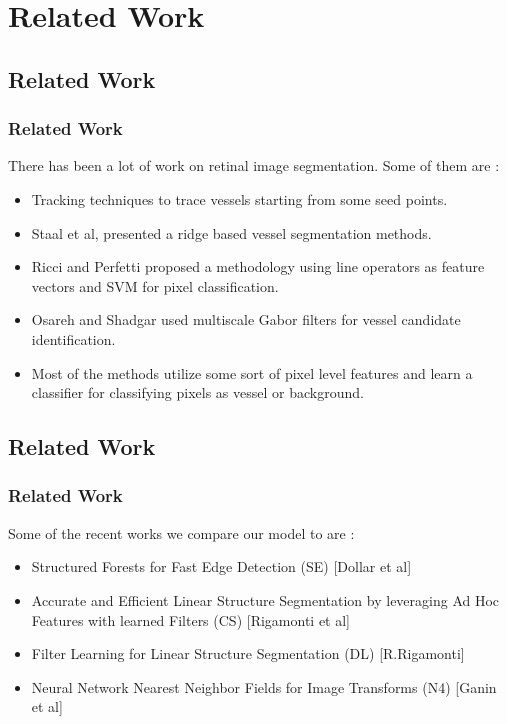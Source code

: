 \documentclass{beamer}
\begin{document}
\section{Related Work}
\subsection{Related Work}


\begin{frame}
\frametitle{Related Work}
There has been a lot of work on retinal image segmentation. Some of them are :
\begin{itemize}
\item Tracking techniques to trace vessels starting from some seed points.
\item Staal et al, presented a ridge based vessel segmentation methods.
\item Ricci and Perfetti proposed a methodology using line operators as feature vectors and SVM for pixel classification.
\item Osareh and Shadgar used multiscale Gabor filters for vessel candidate identification.
\item Most of the methods utilize some sort of pixel level features and learn a classifier for classifying pixels as vessel or background.
\end{itemize}
\end{frame}
\subsection{Related Work}

\begin{frame}
\frametitle{Related Work}
Some of the recent works we compare our model to are :
\begin{itemize}

\item Structured Forests for Fast Edge Detection (SE) [Dollar et al]
\item Accurate and Efficient Linear Structure Segmentation by leveraging Ad Hoc Features with learned Filters (CS) [Rigamonti et al]
\item Filter Learning for Linear Structure Segmentation (DL) [R.Rigamonti]
\item Neural Network Nearest Neighbor Fields for Image Transforms (N4) [Ganin et al]
\end{itemize}

\end{frame}
\end{document}
